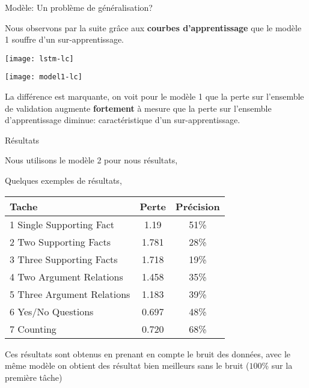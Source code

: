 \documentclass{beamer}
\theoremstyle{definition}
\begin{document}
\begin{frame}{Modèle: Un problème de généralisation?}

Nous observons par la suite grâce aux \textbf{courbes d'apprentissage} que le modèle 1 souffre d'un sur-apprentissage.

\begin{center}
\begin{minipage}[c]{.46\linewidth}
\texttt{[image: lstm-lc]}
\end{minipage}
\begin{minipage}[c]{.46\linewidth}
\texttt{[image: model1-lc]}
\end{minipage}
\end{center}

La différence est marquante, on voit pour le modèle 1 que la perte sur l'ensemble de validation augmente \textbf{fortement} à mesure que la perte sur l'ensemble d'apprentissage diminue: caractéristique d'un sur-apprentissage.

\end{frame}

\begin{frame}{Résultats}

Nous utilisons le modèle 2 pour nous résultats,

\vspace{0.5cm}

Quelques exemples de résultats,

\begin{center}
				\begin{tabular}{lcc}
					
					\toprule
					Tache & Perte & Précision \\ 
					\midrule
                            1 Single Supporting Fact & 1.19  & 51\% \\
                            2 Two Supporting Facts & 1.781 & 28\% \\
                            3 Three Supporting Facts & 1.718 & 19\%\\
                            4 Two Argument Relations & 1.458 & 35\% \\
                            5 Three Argument Relations & 1.183 & 39\% \\
                            6 Yes/No Questions & 0.697 & 48\% \\
                            7 Counting & 0.720 & 68\% \\
\end{tabular}
\end{center}

Ces résultats sont obtenus en prenant en compte le bruit des données, avec le même modèle on obtient des résultat bien meilleurs sans le bruit ($100$\% sur la première tâche)
\end{frame}
\end{document}
